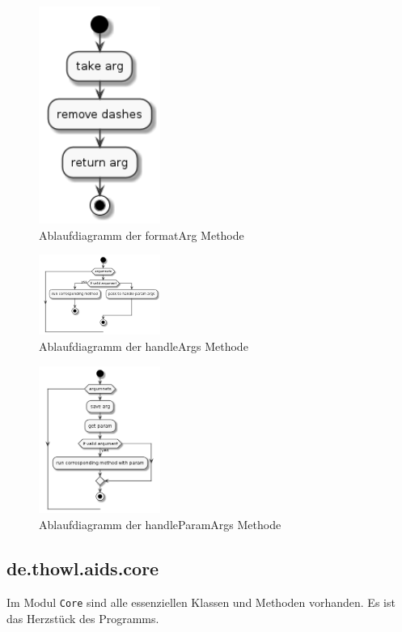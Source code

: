 \documentclass[stu, a4paper, 11pt, floatsintext]{apa7}
\begin{document}
\begin{figure}[!htbp]
\centering
\includegraphics[width=150px]{../technical_documentation/diagramm/uml/flowcharts/cli/formatArg.png}
\caption{\label{formatArg-methode}Ablaufdiagramm der formatArg Methode}
\end{figure}

\begin{figure}[!htbp]
\centering
\includegraphics[width=150px]{../technical_documentation/diagramm/uml/flowcharts/cli/handleArgs.png}
\caption{\label{handleArgs-methode}Ablaufdiagramm der handleArgs Methode}
\end{figure}

\begin{figure}[!htbp]
\centering
\includegraphics[width=150px]{../technical_documentation/diagramm/uml/flowcharts/cli/handleParamArgs.png}
\caption{\label{handleParamArgs-methode}Ablaufdiagramm der handleParamArgs Methode}
\end{figure}

\subsection{de.thowl.aids.core}
\noindent Im Modul \texttt{Core} sind alle essenziellen Klassen und Methoden vorhanden.
Es ist das Herzstück des Programms.
\end{document}
